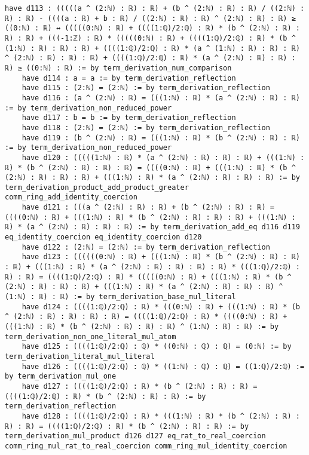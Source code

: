 \documentclass{article}
\begin{document}
\begin{tcolorbox}[colback=white!10, width=\linewidth]
\begin{lstlisting}[language=Lean4]
    have d113 : (((((a ^ (2:ℕ) : ℝ) : ℝ) + (b ^ (2:ℕ) : ℝ) : ℝ) / ((2:ℕ) : ℝ) : ℝ) - ((((a : ℝ) + b : ℝ) / ((2:ℕ) : ℝ) : ℝ) ^ (2:ℕ) : ℝ) : ℝ) ≥ ((0:ℕ) : ℝ) ↔ (((((0:ℕ) : ℝ) + ((((1:ℚ)/2:ℚ) : ℝ) * (b ^ (2:ℕ) : ℝ) : ℝ) : ℝ) + (((-1:ℤ) : ℝ) * (((((0:ℕ) : ℝ) + ((((1:ℚ)/2:ℚ) : ℝ) * (b ^ (1:ℕ) : ℝ) : ℝ) : ℝ) + ((((1:ℚ)/2:ℚ) : ℝ) * (a ^ (1:ℕ) : ℝ) : ℝ) : ℝ) ^ (2:ℕ) : ℝ) : ℝ) : ℝ) + ((((1:ℚ)/2:ℚ) : ℝ) * (a ^ (2:ℕ) : ℝ) : ℝ) : ℝ) ≥ ((0:ℕ) : ℝ) := by term_derivation_num_comparison
    have d114 : a = a := by term_derivation_reflection
    have d115 : (2:ℕ) = (2:ℕ) := by term_derivation_reflection
    have d116 : (a ^ (2:ℕ) : ℝ) = (((1:ℕ) : ℝ) * (a ^ (2:ℕ) : ℝ) : ℝ) := by term_derivation_non_reduced_power
    have d117 : b = b := by term_derivation_reflection
    have d118 : (2:ℕ) = (2:ℕ) := by term_derivation_reflection
    have d119 : (b ^ (2:ℕ) : ℝ) = (((1:ℕ) : ℝ) * (b ^ (2:ℕ) : ℝ) : ℝ) := by term_derivation_non_reduced_power
    have d120 : (((((1:ℕ) : ℝ) * (a ^ (2:ℕ) : ℝ) : ℝ) : ℝ) + (((1:ℕ) : ℝ) * (b ^ (2:ℕ) : ℝ) : ℝ) : ℝ) = ((((0:ℕ) : ℝ) + (((1:ℕ) : ℝ) * (b ^ (2:ℕ) : ℝ) : ℝ) : ℝ) + (((1:ℕ) : ℝ) * (a ^ (2:ℕ) : ℝ) : ℝ) : ℝ) := by term_derivation_product_add_product_greater comm_ring_add_identity_coercion
    have d121 : (((a ^ (2:ℕ) : ℝ) : ℝ) + (b ^ (2:ℕ) : ℝ) : ℝ) = ((((0:ℕ) : ℝ) + (((1:ℕ) : ℝ) * (b ^ (2:ℕ) : ℝ) : ℝ) : ℝ) + (((1:ℕ) : ℝ) * (a ^ (2:ℕ) : ℝ) : ℝ) : ℝ) := by term_derivation_add_eq d116 d119 eq_identity_coercion eq_identity_coercion d120
    have d122 : (2:ℕ) = (2:ℕ) := by term_derivation_reflection
    have d123 : ((((((0:ℕ) : ℝ) + (((1:ℕ) : ℝ) * (b ^ (2:ℕ) : ℝ) : ℝ) : ℝ) + (((1:ℕ) : ℝ) * (a ^ (2:ℕ) : ℝ) : ℝ) : ℝ) : ℝ) * (((1:ℚ)/2:ℚ) : ℝ) : ℝ) = ((((1:ℚ)/2:ℚ) : ℝ) * (((((0:ℕ) : ℝ) + (((1:ℕ) : ℝ) * (b ^ (2:ℕ) : ℝ) : ℝ) : ℝ) + (((1:ℕ) : ℝ) * (a ^ (2:ℕ) : ℝ) : ℝ) : ℝ) ^ (1:ℕ) : ℝ) : ℝ) := by term_derivation_base_mul_literal
    have d124 : ((((1:ℚ)/2:ℚ) : ℝ) * (((0:ℕ) : ℝ) + (((1:ℕ) : ℝ) * (b ^ (2:ℕ) : ℝ) : ℝ) : ℝ) : ℝ) = ((((1:ℚ)/2:ℚ) : ℝ) * ((((0:ℕ) : ℝ) + (((1:ℕ) : ℝ) * (b ^ (2:ℕ) : ℝ) : ℝ) : ℝ) ^ (1:ℕ) : ℝ) : ℝ) := by term_derivation_non_one_literal_mul_atom
    have d125 : ((((1:ℚ)/2:ℚ) : ℚ) * ((0:ℕ) : ℚ) : ℚ) = (0:ℕ) := by term_derivation_literal_mul_literal
    have d126 : ((((1:ℚ)/2:ℚ) : ℚ) * ((1:ℕ) : ℚ) : ℚ) = ((1:ℚ)/2:ℚ) := by term_derivation_mul_one
    have d127 : ((((1:ℚ)/2:ℚ) : ℝ) * (b ^ (2:ℕ) : ℝ) : ℝ) = ((((1:ℚ)/2:ℚ) : ℝ) * (b ^ (2:ℕ) : ℝ) : ℝ) := by term_derivation_reflection
    have d128 : ((((1:ℚ)/2:ℚ) : ℝ) * (((1:ℕ) : ℝ) * (b ^ (2:ℕ) : ℝ) : ℝ) : ℝ) = ((((1:ℚ)/2:ℚ) : ℝ) * (b ^ (2:ℕ) : ℝ) : ℝ) := by term_derivation_mul_product d126 d127 eq_rat_to_real_coercion comm_ring_mul_rat_to_real_coercion comm_ring_mul_identity_coercion

\end{lstlisting}
\end{tcolorbox}
\end{document}
